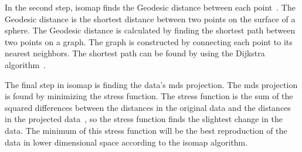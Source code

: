 In the second step, \gls{isomap} finds the Geodesic distance between each point~\cite{Multidimensional-Scaling-Sammon-Mapping-and-Isomap}. The Geodesic distance is the shortest distance between two points on the surface of a sphere. The Geodesic distance is calculated by finding the shortest path between two points on a graph. The graph is constructed by connecting each point to its nearest neighbors. The shortest path can be found by using the Dijkstra algorithm~\cite{multi-dimensional-scaling-leeuw}.

The final step in \gls{isomap} is finding the data's \gls{mds} projection. The \gls{mds} projection is found by minimizing the stress function. The stress function is the sum of the squared differences between the distances in the original data and the distances in the projected data~\cite{multi-dimensional-scaling-leeuw}, so the stress function finds the slightest change in the data. The minimum of this stress function will be the best reproduction of the data in lower dimensional space according to the \gls{isomap} algorithm.








